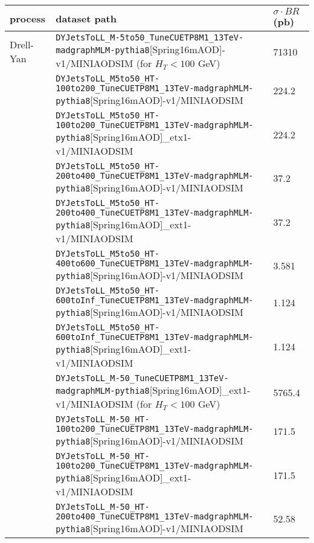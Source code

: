 \begin{table}
  \center
  \tiny
  \begin{tabular}{l|l|l}
     process                & dataset path & $\sigma \cdot BR$ (pb)\\
     \hline
     Drell-Yan              & \verb /DYJetsToLL_M-5to50_TuneCUETP8M1_13TeV-madgraphMLM-pythia8/[Spring16mAOD]-v1/MINIAODSIM \; (for $H_T < 100$ GeV)          & 71310 \\ 
                            & \verb /DYJetsToLL_M5to50_HT-100to200_TuneCUETP8M1_13TeV-madgraphMLM-pythia8/[Spring16mAOD]-v1/MINIAODSIM                        & 224.2 \\
                            & \verb /DYJetsToLL_M5to50_HT-100to200_TuneCUETP8M1_13TeV-madgraphMLM-pythia8/[Spring16mAOD]_etx1-v1/MINIAODSIM                   & 224.2 \\
                            & \verb /DYJetsToLL_M5to50_HT-200to400_TuneCUETP8M1_13TeV-madgraphMLM-pythia8/[Spring16mAOD]-v1/MINIAODSIM                        & 37.2 \\
                            & \verb /DYJetsToLL_M5to50_HT-200to400_TuneCUETP8M1_13TeV-madgraphMLM-pythia8/[Spring16mAOD]_ext1-v1/MINIAODSIM                   & 37.2 \\
                            & \verb /DYJetsToLL_M5to50_HT-400to600_TuneCUETP8M1_13TeV-madgraphMLM-pythia8/[Spring16mAOD]-v1/MINIAODSIM                        & 3.581 \\
                            & \verb /DYJetsToLL_M5to50_HT-600toInf_TuneCUETP8M1_13TeV-madgraphMLM-pythia8/[Spring16mAOD]-v1/MINIAODSIM                        & 1.124 \\
                            & \verb /DYJetsToLL_M5to50_HT-600toInf_TuneCUETP8M1_13TeV-madgraphMLM-pythia8/[Spring16mAOD]_ext1-v1/MINIAODSIM                   & 1.124 \\
                            & \verb /DYJetsToLL_M-50_TuneCUETP8M1_13TeV-madgraphMLM-pythia8/[Spring16mAOD]_ext1-v1/MINIAODSIM \; (for $H_T < 100$ GeV)        & 5765.4 \\
                            & \verb /DYJetsToLL_M-50_HT-100to200_TuneCUETP8M1_13TeV-madgraphMLM-pythia8/[Spring16mAOD]-v1/MINIAODSIM                          & 171.5 \\
                            & \verb /DYJetsToLL_M-50_HT-100to200_TuneCUETP8M1_13TeV-madgraphMLM-pythia8/[Spring16mAOD]_ext1-v1/MINIAODSIM                     & 171.5 \\
                            & \verb /DYJetsToLL_M-50_HT-200to400_TuneCUETP8M1_13TeV-madgraphMLM-pythia8/[Spring16mAOD]-v1/MINIAODSIM                          & 52.58 \\

\end{tabular}
\end{table}
